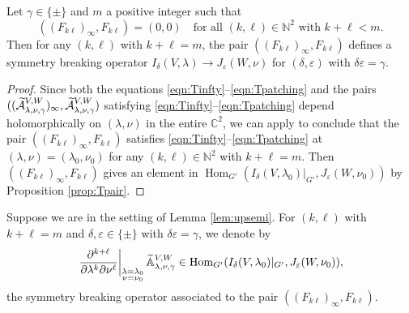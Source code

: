 \begin{lemma}
\label{lem:upsemi}
Let $\gamma \in \{ \pm \}$ and $m$ a positive integer
 such that 
\[
   ((F_{k \ell})_{\infty}, F_{k \ell})=(0,0)
\quad\text{for all $(k, \ell)\in {\mathbb{N}}^2$ with $k+\ell<m$.}
\]  
Then for any $(k,\ell)$ with $k+\ell=m$, 
 the pair $((F_{k\ell})_{\infty}, F_{k\ell})$ defines a symmetry breaking operator
 $I_{\delta}(V,\lambda) \to J_{\varepsilon}(W,\nu)$
 for $(\delta, \varepsilon)$ with $\delta \varepsilon=\gamma$.  
\end{lemma}

\begin{proof}
Since both the equations \eqref{eqn:Tinfty}--\eqref{eqn:Tpatching}
 and the pairs
$
   ((\widetilde{{\mathcal{A}}}_{{\lambda},{\nu},{\gamma}}^{{V,W}})_{\infty}, 
    \widetilde{{\mathcal{A}}}_{{\lambda},{\nu},{\gamma}}^{{V,W}})
$
 satisfying \eqref{eqn:Tinfty}--\eqref{eqn:Tpatching}
 depend holomorphically on $(\lambda,\nu)$
 in the entire ${\mathbb{C}}^2$, 
 we can apply \cite[Lem.~11.10]{sbon} 
 to conclude that the pair $((F_{k \ell})_{\infty},F_{k \ell})$ satisfies
 \eqref{eqn:Tinfty}--\eqref{eqn:Tpatching}
 at $(\lambda, \nu)=(\lambda_0, \nu_0)$ 
 for any $(k, \ell)\in {\mathbb{N}}^2$ with $k+\ell=m$.  
Then $((F_{k \ell})_{\infty},F_{k \ell})$ gives an element
 in 
$
   {\operatorname{Hom}}_{G'}
   (I_{\delta}(V,\lambda_0)|_{G'},J_{\varepsilon}(W,\nu_0))
$
by Proposition \ref{prop:Tpair}.  
\end{proof}

\begin{definition}
\label{def:AVWder}
Suppose we are in the setting of Lemma \ref{lem:upsemi}.  
For $(k,\ell)$ with $k+\ell=m$
 and $\delta, \varepsilon \in \{ \pm \}$ with $\delta \varepsilon = \gamma$, 
 we denote by 
\[
 \left. \frac{\partial^{k+\ell}}{\partial \lambda^k \partial \nu^\ell}
 \right|_{\substack {\lambda=\lambda_0 \\ \nu = \nu_0}} 
 {\widetilde{\mathbb{A}}}_{{\lambda},{\nu},{\gamma}}^{{V, W}}
 \in 
 {\operatorname{Hom}}_{G'}(I_{\delta}(V,\lambda_0)|_{G'}, J_{\varepsilon}(W,\nu_0)), 
\]
the symmetry breaking operator
 associated to the pair $((F_{k \ell})_{\infty}, F_{k \ell})$.  
\end{definition}

